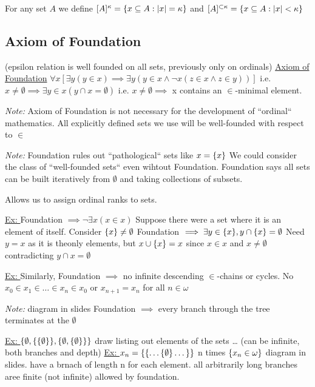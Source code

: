 \dfn For any set $A$ we define $[A]^\kappa = \{x \subseteq A : |x| = \kappa\}$
and $[A]^{\subset \kappa} = \{x \subseteq A : |x| < \kappa\}$

\subsection{Axiom of Foundation}
(epsilon relation is well founded on all sets, previously only on ordinals)
\dfn \underline{Axiom of Foundation}
$\forall x [\exists y (y \in x) \implies \exists y (y \in x \wedge \neg x (z \in x \wedge z \in y))]$
i.e. $x \neq \emptyset \implies \exists y \in x (y \cap x = \emptyset)$
i.e. $x \neq \emptyset \implies$ x contains an $\in$-minimal element.

\emph{Note: } Axiom of Foundation is not necessary for the development of ``ordinal`` mathematics.
All explicitly defined sets we use will be well-founded with respect to $\in$

\emph{Note: } Foundation rules out ``pathological`` sets like $x = \{x\}$
We could consider the class of ``well-founded sets`` even wihtout Foundation.
Foundation says all sets can be built iteratively from $\emptyset$ and taking collections of subsets.

Allows us to assign ordinal ranks to sets.

\underline{Ex: } Foundation $\implies \neg \exists x (x \in x)$
Suppose there were a set where it is an element of itself.
Consider $\{x\} \neq \emptyset$
Foundation $\implies \exists y \in \{x\}, y \cap \{x\} = \emptyset$
Need $y=x$ as it is theonly elements, but $x \cup \{x\} = x$ since $x \in x$ and $x \neq \emptyset$ contradicting $y \cap x = \emptyset$

\underline{Ex: } Similarly, Foundation $\implies$ no infinite descending $\in$-chains or cycles.
No $x_0 \in x_1 \in \dots \in x_n \in x_0$ or $x_{n+1} = x_n $ for all $n \in \omega$

\emph{Note: } diagram in slides
Foundation $\implies$ every branch through the tree terminates at the $\emptyset$

\underline{Ex: } $\{\emptyset, \{\{\emptyset\}\}, \{\emptyset,\{\emptyset\}\}\}$
draw listing out elements of the sets \dots
(can be infinite, both branches and depth)
\underline{Ex: } $x_n = \{\{\dots \{\emptyset\} \dots\}\}$ n times $\{x_n \in \omega\}$ diagram in slides.
have a brnach of length n for each element.
all arbitrarily long branches aree finite (not infinite) allowed by foundation.

